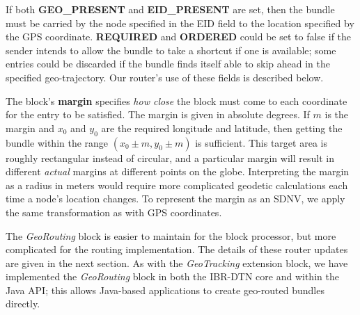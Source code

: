 If both {\bf GEO\_PRESENT} and {\bf EID\_PRESENT} are set, then the bundle must be carried by the node specified in the EID field to the location specified by the GPS coordinate.  {\bf REQUIRED} and {\bf ORDERED} could be set to false if the sender intends to allow the bundle to take a shortcut if one is available; some entries could be discarded if the bundle finds itself able to skip ahead in the specified geo-trajectory. Our router's use of these fields is described below.

The block's {\bf margin} specifies {\em how close} the block must come to each coordinate for the entry to be satisfied. The margin is given in absolute degrees. If $m$ is the margin and $x_0$ and $y_0$ are the required longitude and latitude, then getting the bundle within the range $(x_0\pm m, y_0\pm m)$ is sufficient.  This target area is roughly rectangular instead of circular, and a particular margin will result in different {\it actual} margins at different points on the globe.  Interpreting the margin as a radius in meters would require more complicated geodetic calculations each time a node's location changes. To represent the margin as an SDNV, we apply the same transformation as with GPS coordinates.

The {\em GeoRouting} block is easier to maintain for the block processor, but more complicated for the routing implementation. The details of these router updates are given in the next section. As with the {\em GeoTracking} extension block, we have implemented the {\em GeoRouting} block in both the IBR-DTN core and within the Java API; this allows Java-based applications to create geo-routed bundles directly.


